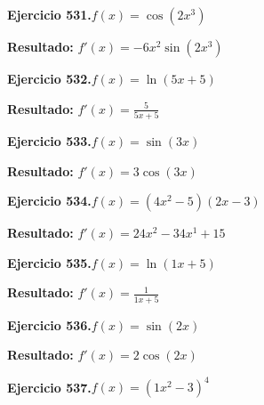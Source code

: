 \documentclass[10pt,a4paper]{article}
\begin{document}
\begin{ejbox}
\textbf{Ejercicio 531.}\quad $f(x) = \cos(2x^{3})$
\end{ejbox}

\begin{solbox}
\textbf{Resultado:} \(\displaystyle f'(x) = -6x^{2}\sin(2x^{3})\)
\end{solbox}

\newpage
\begin{ejbox}
\textbf{Ejercicio 532.}\quad $f(x) = \ln(5x + 5)$
\end{ejbox}

\begin{solbox}
\textbf{Resultado:} \(\displaystyle f'(x) = \frac{5}{5x + 5}\)
\end{solbox}

\begin{ejbox}
\textbf{Ejercicio 533.}\quad $f(x) = \sin(3x)$
\end{ejbox}

\begin{solbox}
\textbf{Resultado:} \(\displaystyle f'(x) = 3\cos(3x)\)
\end{solbox}

\begin{ejbox}
\textbf{Ejercicio 534.}\quad $f(x) = (4x^{2} -5)(2x -3)$
\end{ejbox}

\begin{solbox}
\textbf{Resultado:} \(\displaystyle f'(x) = 24x^{2} -34x^{1} +15\)
\end{solbox}

\newpage
\begin{ejbox}
\textbf{Ejercicio 535.}\quad $f(x) = \ln(1x + 5)$
\end{ejbox}

\begin{solbox}
\textbf{Resultado:} \(\displaystyle f'(x) = \frac{1}{1x + 5}\)
\end{solbox}

\begin{ejbox}
\textbf{Ejercicio 536.}\quad $f(x) = \sin(2x)$
\end{ejbox}

\begin{solbox}
\textbf{Resultado:} \(\displaystyle f'(x) = 2\cos(2x)\)
\end{solbox}

\begin{ejbox}
\textbf{Ejercicio 537.}\quad $f(x) = (1x^{2} -3)^{4}$
\end{ejbox}
\end{document}
